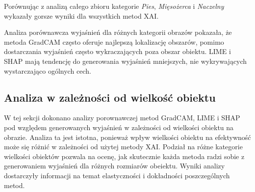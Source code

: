 Porównując z analizą całego zbioru kategorie \textit{Pies}, \textit{Mięsożerca} i \textit{Naczelny} wykazały gorsze wyniki dla wszystkich metod XAI.

\vspace{1cm}

Analiza porównawcza wyjaśnień dla różnych kategorii obrazów pokazała, że metoda GradCAM często oferuje najlepszą lokalizację obszarów, pomimo dostarczania wyjaśnień często wykraczających poza obszar obiektu.
LIME i SHAP mają tendencję do generowania wyjaśnień mniejszych, nie wykrywających wystarczająco ogólnych cech.

\subsection*{Analiza w zależności od wielkość obiektu}

W tej sekcji dokonano analizy porownawczej metod GradCAM, LIME i SHAP pod względem generowanych wyjaśnień w zależności od wielkości obiektu na obrazie.
Analiza ta jest istotna, ponieważ wpływ wielkości obiektu na efektywność może się różnić w zależności od użytej metody XAI.
Podział na różne kategorie wielkości obiektów pozwala na ocenę, jak skutecznie każda metoda radzi sobie z generowaniem wyjaśnień dla różnych rozmiarów obeiektu.
Wyniki analizy dostarczyły informacji na temat elastyczności i dokładności poszczególnych metod.

